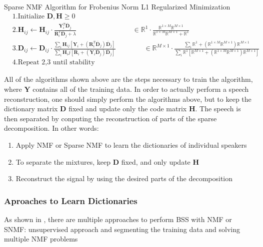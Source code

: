 \begin{codebox}
Sparse NMF Algorithm for Frobenius Norm L1 Regularized Minimization
\begin{align*}
    &1. \text{Initialize }\bm{D,H} \geq 0 \\
    &2. \bm{H}_{ij} \leftarrow \bm{H}_{ij} \cdot \frac{ \bm{Y}_i^T \bar{\bm{D}}_j }{  \bm{R}_i^T  \bar{\bm{D}}_j + \lambda } \quad \quad \quad \quad \quad \quad \quad \quad \in \mathbb{R}^1 \cdot \frac{\mathbb{R}^{1\times M} \mathbb{R}^{M \times 1}}{\mathbb{R}^{1\times M} \mathbb{R}^{M \times 1} + \mathbb{R}^{1}} \\
    &3. \bm{D}_{ij} \leftarrow \bm{D}_{ij} \cdot \frac{ \sum_i \bm{H}_{ij} [ \bm{Y}_i + (\bm{R}_i^T \bar{\bm{D}}_j) \bar{\bm{D}}_j] }{ \sum_i \bm{H}_ij [\bm{R}_i + (\bm{Y}_i \bar{\bm{D}}_j) \bar{\bm{D}}_j ]} \quad \quad \quad \quad \in \mathbb{R}^{M\times 1} \cdot \frac{  \sum_i \mathbb{R}^{1} + (\mathbb{R}^{1\times M} \mathbb{R}^{M\times 1})\mathbb{R}^{M\times 1}  }{ \sum_i \mathbb{R}^{1} [\mathbb{R}^{M \times 1} + (\mathbb{R}^{1\times M} \mathbb{R}^{M\times 1}) \mathbb{R}^{M\times 1}]  }\\
    &4. \text{Repeat 2,3 until stability}
\end{align*}
\end{codebox}

All of the algorithms shown above are the steps necessary to train the algorithm, where $\bm{Y}$ contains all of the training data. In order to actually perform a speech reconstruction, one should simply perform the algorithms above, but to keep the dictionary matrix $\bm{D}$ fixed and update only the code matrix $\bm{H}$. The speech is then separated by conputing the reconstruction of parts of the sparse decomposition. In other words:
\begin{enumerate}
    \item Apply NMF or Sparse NMF to learn the dictionaries of individual speakers
    \item To separate the mixtures, keep $\bm{D}$ fixed, and only update $\bm{H}$
    \item Reconstruct the signal by using the desired parts of the decomposition
\end{enumerate}


\subsubsection{Aproaches to Learn Dictionaries}
As shown in \cite{singlechannel}, there are multiple approaches to perform BSS with NMF or SNMF: unsupervised approach and segmenting the training data and solving multiple NMF problems

